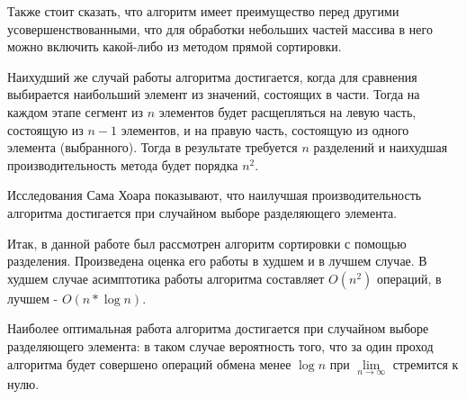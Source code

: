 \documentclass[bachelor, och, labwork]{shiza}
\begin{document}
Также стоит сказать, что алгоритм имеет преимущество перед другими
усовершенствованными, что для обработки небольших частей массива в него можно 
включить какой-либо из методом прямой сортировки.

Наихудший же случай работы алгоритма достигается, когда для сравнения выбирается
наибольший элемент из значений, состоящих в части. Тогда на каждом этапе сегмент 
из $n$ элементов будет расщепляться на левую часть, состоящую из $n-1$ элементов,
и на правую часть, состоящую из одного элемента (выбранного). Тогда в результате
требуется $n$ разделений и наихудшая производительность метода будет порядка 
$n^2$. 

Исследования Сама Хоара показывают, что наилучшая производительность алгоритма
достигается при случайном выборе разделяющего элемента.

\conclusion

Итак, в данной работе был рассмотрен алгоритм сортировки с помощью разделения.
Произведена оценка его работы в худшем и в лучшем случае. В худшем случае
асимптотика работы алгоритма составляет $O(n^2)$ операций, 
в лучшем - $O(n*\log n)$.

Наиболее оптимальная работа алгоритма достигается при случайном выборе
разделяющего элемента: в таком случае вероятность того, что за один проход
алгоритма будет совершено операций обмена менее $\log n$ при 
$\lim\limits_{n\rightarrow\infty }$ стремится к нулю.
\end{document}
